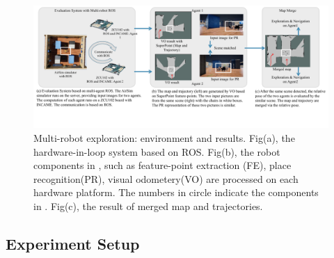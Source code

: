 \label{sec:experiments}


\begin{figure}[t]
  \centering
  \includegraphics[width=0.99\linewidth]{fig/env.pdf}
  \caption{Multi-robot exploration: environment and results. Fig(a), the hardware-in-loop system based on ROS. Fig(b), the robot components in , such as feature-point extraction (FE), place recognition(PR), visual odometery(VO) are processed on each hardware platform. The numbers in circle indicate the components in . Fig(c), the result of merged map and trajectories.}
  \label{fig:env}
\end{figure}





\subsection{ Experiment Setup }

